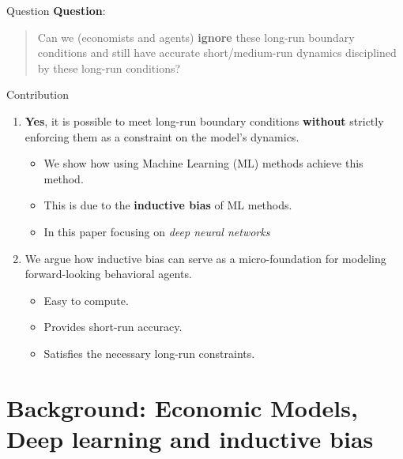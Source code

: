 \documentclass[aspectratio=169,10pt]{beamer}
\newcommand{\emphcolor}[1]{\textbf{\textcolor{emphcolorval}{#1}}}
\begin{document}
\begin{frame}{Question}
	\emphcolor{Question}:
	\hspace{200mm}
	
	\begin{quote}
			Can we (economists and agents) \emphcolor{ignore} these long-run boundary conditions and still have accurate short/medium-run dynamics disciplined by these long-run conditions?
	\end{quote}
\end{frame}



\begin{frame}{Contribution}
	
\begin{enumerate}
	\item \emphcolor{Yes}, it is possible to meet
	long-run boundary conditions \emphcolor{without} strictly enforcing them as a constraint on the model’s dynamics.
	\vspace{0.05in}
	\begin{itemize}
		\item We show how using Machine Learning (ML) methods achieve this method.
		\vspace{0.025in}
		\item This is due to the \emphcolor{inductive bias} of ML methods.
		\vspace{0.025in} 
		\item In this paper focusing on \emph{deep neural networks}
		\vspace{0.025in} 
	\end{itemize} 
	\item We argue how inductive bias can serve as a micro-foundation for modeling forward-looking behavioral agents.
	\vspace{0.025in}
	\begin{itemize}
		\item Easy to compute. 
		\vspace{0.025in}
		\item Provides short-run accuracy.
		\vspace{0.025in}
		\item Satisfies the necessary long-run constraints.
	\end{itemize}
\end{enumerate}

\end{frame}

\section{\textcolor{PennBlue}{Background: Economic Models, Deep learning and inductive bias}}
\end{document}
